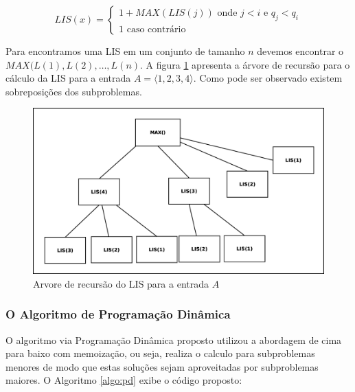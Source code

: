 \documentclass[12pt]{article}
\begin{document}
\begin{equation} \label{eq_lis}
LIS(x)=\begin{cases}
               1 + MAX(LIS(j)) \textrm{ onde }j < i \textrm{ e } q_{j} < q_{i}\\
               1 \textrm{ caso contrário }
       \end{cases}
\end{equation}

Para encontramos uma LIS em um conjunto de tamanho $n$ devemos encontrar o $MAX(L(1),L(2),\ldots,L(n)$. A figura \ref{fig:sobreposicao} apresenta a árvore de recursão para o cálculo da LIS para a entrada $ A = \langle1,2,3,4\rangle$. Como pode ser observado existem sobreposições dos subproblemas. 

\begin{figure}[ht]
\centering
\includegraphics[width=.7\textwidth]{sobreposicao.eps}
\caption{Arvore de recursão do LIS para a entrada $A$ }
\label{fig:sobreposicao}
\end{figure}

\subsubsection{O Algoritmo de Programação Dinâmica}
\label{subsubsec:alg:pd}

O algoritmo via Programação Dinâmica proposto utilizou a abordagem de cima para baixo com memoização, ou seja, realiza o calculo para subproblemas menores de modo que estas soluções sejam aproveitadas por subproblemas maiores. O Algoritmo \ref{algo:pd} exibe o código proposto:
\end{document}
